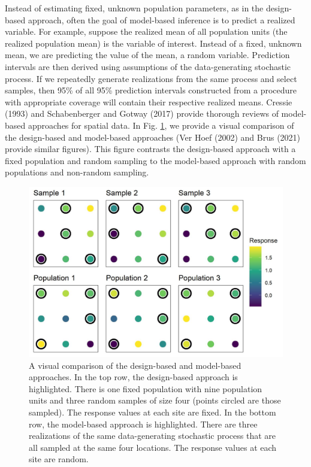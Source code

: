 \documentclass[]{elsarticle} %
\begin{document}
Instead of estimating fixed, unknown population parameters, as in the
design-based approach, often the goal of model-based inference is to
predict a realized variable. For example, suppose the realized mean of
all population units (the realized population mean) is the variable of
interest. Instead of a fixed, unknown mean, we are predicting the value
of the mean, a random variable. Prediction intervals are then derived
using assumptions of the data-generating stochastic process. If we
repeatedly generate realizations from the same process and select
samples, then 95\% of all 95\% prediction intervals constructed from a
procedure with appropriate coverage will contain their respective
realized means. Cressie (1993) and Schabenberger and Gotway (2017)
provide thorough reviews of model-based approaches for spatial data. In
Fig. \ref{fig:fig1}, we provide a visual comparison of the design-based
and model-based approaches (Ver Hoef (2002) and Brus (2021) provide
similar figures). This figure contrasts the design-based approach with a
fixed population and random sampling to the model-based approach with
random populations and non-random sampling.

\begin{figure}
  \centering
  \includegraphics[width = 1\linewidth]{figures/dvm_comp.jpeg}
  \caption{A visual comparison of the design-based and model-based approaches. In the top row, the design-based approach is highlighted. There is one fixed population with nine population units and three random samples of size four (points circled are those sampled). The response values at each site are fixed. In the bottom row, the model-based approach is highlighted. There are three realizations of the same data-generating stochastic process that are all sampled at the same four locations. The response values at each site are random.}
  \label{fig:fig1}
\end{figure}
\end{document}
